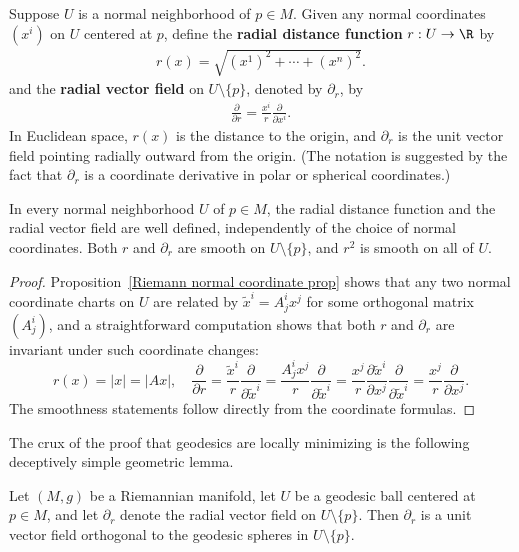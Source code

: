 Suppose $U$ is a normal neighborhood of $p\in M$. Given any normal coordinates $(x^i)$ on $U$ centered at $p$, define the \textbf{radial distance function} $r:U\to\R$ by
\begin{align}\label{Riemann radial diatance def}
r(x)=\sqrt{(x^1)^2+\cdots+(x^n)^2}.
\end{align}
and the \textbf{radial vector field} on $U\setminus\{p\}$, denoted by $\partial_r$, by
\begin{align}\label{Riemann radial vector field def}
\frac{\partial}{\partial r}=\frac{x^i}{r}\frac{\partial}{\partial x^i}.
\end{align}
In Euclidean space, $r(x)$ is the distance to the origin, and $\partial_r$ is the unit vector field pointing radially outward from the origin. (The notation is suggested by the fact that $\partial_r$ is a coordinate derivative in polar or spherical coordinates.)
\begin{lemma}\label{Riemann radial distance smooth}
In every normal neighborhood $U$ of $p\in M$, the radial distance function and the radial vector field are well defined, independently of the choice of normal coordinates. Both $r$ and $\partial_r$ are smooth on $U\setminus\{p\}$, and $r^2$ is smooth on all of $U$.
\end{lemma}
\begin{proof}
Proposition~\ref{Riemann normal coordinate prop} shows that any two normal coordinate charts on $U$ are related by $\tilde{x}^i=A^i_jx^j$ for some orthogonal matrix $(A^i_j)$, and a straightforward computation shows that both $r$ and $\partial_r$ are invariant under such coordinate changes:
\[r(x)=|x|=|Ax|,\quad\frac{\partial}{\partial r}=\frac{\tilde{x}^i}{r}\frac{\partial}{\partial\tilde{x}^i}=\frac{A^i_jx^j}{r}\frac{\partial}{\partial\tilde{x}^i}=\frac{x^j}{r}\frac{\partial\tilde{x}^i}{\partial x^j}\frac{\partial}{\partial\tilde{x}^i}=\frac{x^j}{r}\frac{\partial}{\partial x^j}.\]
The smoothness statements follow directly from the coordinate formulas.
\end{proof}
The crux of the proof that geodesics are locally minimizing is the following deceptively simple geometric lemma.
\begin{theorem}\label{Gauss lemma}
Let $(M,g)$ be a Riemannian manifold, let $U$ be a geodesic ball centered at $p\in M$, and let $\partial_r$ denote the radial vector field on $U\setminus\{p\}$. Then  $\partial_r$ is a unit vector field orthogonal to the geodesic spheres in $U\setminus\{p\}$.
\end{theorem}
